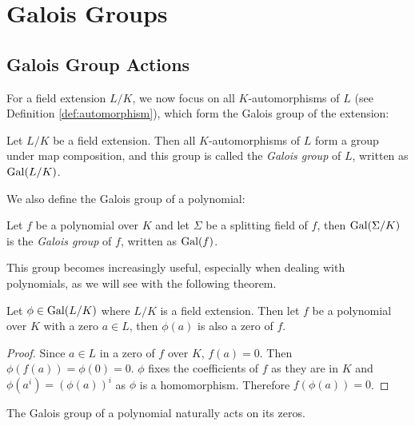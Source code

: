 \section{Galois Groups}
\subsection{Galois Group Actions}

For a field extension $L/K$, we now focus on all $K$-automorphisms of $L$ (see Definition \ref{def:automorphism}), which form the Galois group of the extension:


\begin{definition}
    Let $L/K$ be a field extension. Then all $K$-automorphisms of $L$ form a group under map composition, and this group is called the \textit{Galois group} of $L$, written as \(\operatorname{Gal}(L/K)\).
\end{definition}

We also define the Galois group of a polynomial:

\begin{definition}
	Let $f$ be a polynomial over $K$ and let $\Sigma$ be a splitting field of $f$, then $\operatorname{Gal}(\Sigma/K)$ is the \textit{Galois group} of $f$, written as \(\operatorname{Gal}(f)\).
	
\end{definition}

This group becomes increasingly useful, especially when dealing with polynomials, as we will see with the following theorem.

\begin{theorem} \label{thm:galois-group-permutes-zeros}
Let $\phi \in \operatorname{Gal}(L/K)$ where $L/K$ is a field extension. Then let $f$ be a polynomial over $K$ with a zero $a \in L$, then $\phi(a)$ is also a zero of $f$.
\end{theorem}

\begin{proof}
    Since $a \in L$ in a zero of $f$ over $K$, $f(a) = 0$. Then $\phi(f(a)) = \phi(0) = 0$. $\phi$ fixes the coefficients of $f$ as they are in $K$ and $\phi\left(a^i\right) = \left(\phi(a) \right) ^i$ as $\phi$ is a homomorphism. Therefore $f(\phi(a)) = 0$. 
\end{proof}

The Galois group of a polynomial naturally acts on its zeros.

